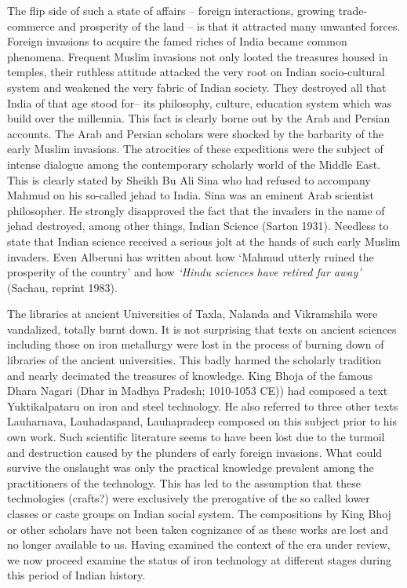 The flip side of such a state of affairs – foreign interactions, growing trade-commerce and prosperity of the land – is that it attracted many unwanted forces. Foreign invasions to acquire the famed riches of India became common phenomena. Frequent Muslim invasions not only looted the treasures housed in temples, their ruthless attitude attacked the very root on Indian socio-cultural system and weakened the very fabric of Indian society. They destroyed all that India of that age stood for– its philosophy, culture, education system which was build over the millennia. This fact is clearly borne out by the Arab and Persian accounts. The Arab and Persian scholars were shocked by the barbarity of the early Muslim invasions. The atrocities of these expeditions were the subject of intense dialogue among the contemporary scholarly world of the Middle East. This is clearly stated by Sheikh Bu Ali Sina who had refused to accompany Mahmud on his so-called jehad to India. Sina was an eminent Arab scientist philosopher. He strongly disapproved the fact that the invaders in the name of jehad  destroyed, among other things, Indian Science (Sarton 1931). Needless to state that Indian science received a serious jolt at the hands of such early Muslim invaders. Even Alberuni has written about how `Mahmud utterly ruined the prosperity of the country' and how {\it `Hindu sciences have retired far away'} (Sachau, reprint 1983). 

The libraries at ancient Universities of Taxla, Nalanda and Vikramshila were vandalized, totally burnt down. It is not surprising that texts on ancient sciences including those on iron metallurgy were lost in the process of burning down of libraries of the ancient universities. This badly harmed the scholarly tradition and nearly decimated the treasures of knowledge. King Bhoja of the famous Dhara Nagari (Dhar in Madhya Pradesh; 1010-1053 CE)) had composed a text Yuktikalpataru on iron and steel technology. He also referred to three other texts Lauharnava, Lauhadaspand, Lauhapradeep composed on this subject prior to his own work. Such scientific literature seems to have been lost due to the turmoil and destruction caused by the plunders of early foreign invasions. What could survive the onslaught was only the practical knowledge prevalent among the practitioners of the technology. This has led to the assumption that these technologies (crafts?) were exclusively the prerogative of the so called lower classes or caste groups on Indian social system. The compositions by King Bhoj or other scholars have not been taken cognizance of as these works are lost and no longer available to us. Having examined the context of the era under review, we now proceed examine the status of iron technology at different stages during this period of Indian history.


